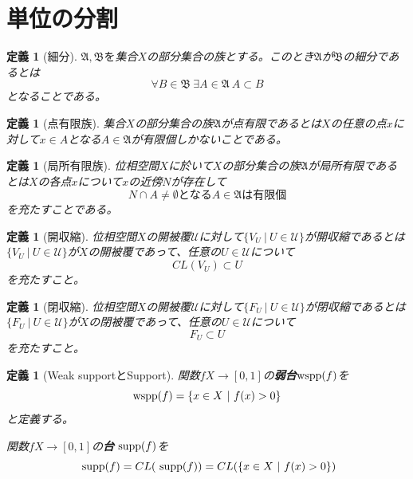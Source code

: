 \documentclass[leqno]{jsarticle}
\newtheorem{df}[thm]{定義}
\newcommand{\supp}{\text{  {\rm supp}} }
\newcommand{\wspp}{\text{{\rm wspp}}}
\begin{document}
\section{単位の分割}
\begin{df}[細分]$\mathfrak{A},\mathfrak{B}を$集合$X$の部分集合の族とする。このとき$\mathfrak{A}$が$\mathfrak{B}$の細分であるとは
\[
\forall B\in \mathfrak{B}\ \exists A\in \mathfrak{A}\ A\subset B
\]
となることである。
\end{df}

\begin{df}[点有限族]集合$X$の部分集合の族$\mathfrak{A}$が点有限であるとは$X$の任意の点$x$に対して$x\in A$となる$A\in \mathfrak{A}$が有限個しかないことである。

\end{df}

\begin{df}[局所有限族]位相空間$X$に於いて$X$の部分集合の族$\mathfrak{A}$が局所有限であるとは$X$の各点$x$について$x$の近傍$N$が存在して
\[
N\cap A\neq \emptyset となるA\in \mathfrak{A}は有限個
\]
を充たすことである。
\end{df}

\begin{df}[開収縮]位相空間$X$の開被覆$\mathcal{U}$に対して$\{V_U\ |\ U\in \mathcal{U}\}$が開収縮であるとは$\{V_U\ |\ U\in \mathcal{U}\}$が$X$の開被覆であって、任意の$U\in \mathcal{U}$について
\[
CL(V_U)\subset U
\]
を充たすこと。
\end{df}

\begin{df}[閉収縮]位相空間$X$の開被覆$\mathcal{U}$に対して$\{F_U\ |\ U\in \mathcal{U}\}$が閉収縮であるとは$\{F_U\ |\ U\in \mathcal{U}\}$が$X$の閉被覆であって、任意の$U\in \mathcal{U}$について
\[
F_{U}\subset U
\]
を充たすこと。
\end{df}


\begin{df}[Weak supportとSupport]
関数$fX\to [0,1]$の{\bf 弱台}$\wspp (f)$を
\[
\wspp (f)=\{x\in X\ |\ f(x)>0\}
\]
と定義する。\par
関数$fX\to [0,1]$の{\bf 台}$\supp (f)$を
\[
\supp (f)=CL(\supp(f))=CL(\{x\in X\ |\ f(x)>0\})
\]

\end{df}
\end{document}
